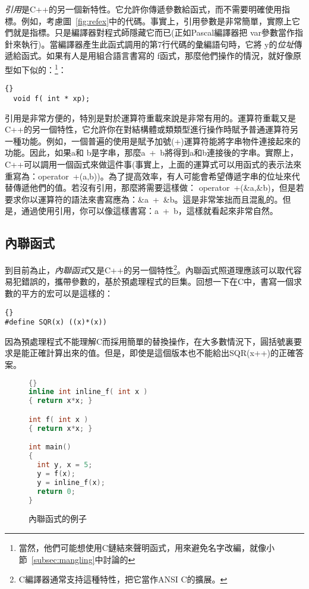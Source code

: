 \emph{引用}是C++的另一個新特性。它允許你傳遞參數給函式，而不需要明確使用指標。例如，考慮圖~\ref{fig:refex}中的代碼。事實上，引用參數是非常簡單，實際上它們就是指標。只是編譯器對程式師隱藏它而已(正如Pascal編譯器把{\code
var}參數當作指針來執行)。當編譯器產生此函式調用的第7行代碼的彙編語句時，它將{\code
y}的\emph{位址}傳遞給函式。如果有人是用組合語言書寫的{\code
f}函式，那麼他們操作的情況，就好像原型如下似的：\footnote{當然，他們可能想使用C鏈結來聲明函式，用來避免名字改編，就像小節~\ref{subsec:mangling}中討論的}：
\begin{lstlisting}[stepnumber=0]{}
  void f( int * xp);
\end{lstlisting}

引用是非常方便的，特別是對於運算符重載來說是非常有用的。運算符重載又是C++的另一個特性，它允許你在對結構體或類類型進行操作時賦予普通運算符另一種功能。例如，一個普遍的使用是賦予加號({\code +})運算符能將字串物件連接起來的功能。因此，如果{\code a}和{\code
b}是字串，那麼{\code a~+~b}將得到{\code a}和{\code b}連接後的字串。實際上，C++可以調用一個函式來做這件事(事實上，上面的運算式可以用函式的表示法來重寫為：{\code operator~+(a,b)})。為了提高效率，有人可能會希望傳遞字串的位址來代替傳遞他們的值。若沒有引用，那麼將需要這樣做：{\code
operator~+(\&a,\&b)}，但是若要求你以運算符的語法來書寫應為：{\code \&a~+~\&b}。這是非常笨拙而且混亂的。但是，通過使用引用，你可以像這樣書寫：{\code a~+~b}，這樣就看起來非常自然。

\subsection{內聯函式}

到目前為止，\emph{內聯函式}又是C++的另一個特性\footnote{
C編譯器通常支持這種特性，把它當作ANSI C的擴展。}。內聯函式照道理應該可以取代容易犯錯誤的，攜帶參數的，基於預處理程式的巨集。回想一下在C中，書寫一個求數的平方的宏可以是這樣的：
\begin{lstlisting}[stepnumber=0]{}
#define SQR(x) ((x)*(x))
\end{lstlisting}
\noindent 因為預處理程式不能理解C而採用簡單的替換操作，在大多數情況下，圓括號裏要求是能正確計算出來的值。但是，即使是這個版本也不能給出{\code SQR(x++)}的正確答案。

\begin{figure}
\begin{lstlisting}[language=C++,frame=tlrb]{}
inline int inline_f( int x )
{ return x*x; }

int f( int x )
{ return x*x; }

int main()
{
  int y, x = 5;
  y = f(x);
  y = inline_f(x);
  return 0;
}
\end{lstlisting}
\caption{內聯函式的例子 \label{fig:InlineFun}}
\end{figure}


